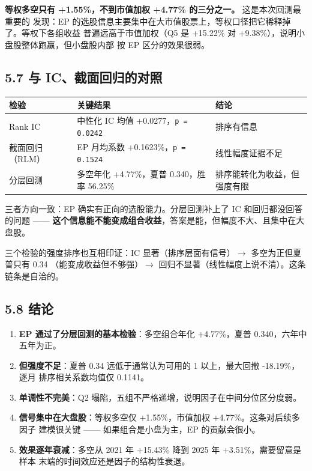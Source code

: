 \documentclass[UTF8,a4paper,11pt]{ctexart}
\begin{document}
\textbf{等权多空只有 +1.55\%，不到市值加权 +4.77\% 的三分之一。} 这是本次回测最重要的
发现：EP 的选股信息主要集中在大市值股票上，等权口径把它稀释掉了。等权下各组收益
普遍远高于市值加权（Q5 是 +15.22\% 对 +9.38\%），说明小盘股整体跑赢，但小盘股内部
按 EP 区分的效果很弱。

{}
\subsection*{5.7 与 IC、截面回归的对照}

\begin{table}[htbp]
\centering
\begin{tabularx}{\textwidth}{@{}YYY@{}}
\toprule
检验 & 关键结果 & 结论 \\
\midrule
Rank IC & 中性化 IC 均值 +0.0277，\texttt{p = 0.0242} & 排序有信息 \\
截面回归（RLM） & EP 月均系数 +0.1623\%，\texttt{p = 0.1524} & 线性幅度证据不足 \\
分层回测 & 多空年化 +4.77\%，夏普 0.340，胜率 56.25\% & 排序能转化为收益，但强度有限 \\
\bottomrule
\end{tabularx}
\end{table}

三者方向一致：EP 确实有正向的选股能力。分层回测补上了 IC 和回归都没回答的问题 ——
\textbf{这个信息能不能变成组合收益}，答案是能，但幅度不大、且集中在大盘股。

三个检验的强度排序也互相印证：IC 显著（排序层面有信号）$\rightarrow$ 多空为正但夏普只有 0.34
（能变成收益但不够强）$\rightarrow$ 回归不显著（线性幅度上说不清）。这条链条是自洽的。

{}
\subsection*{5.8 结论}

\begin{enumerate}[leftmargin=2.2em,itemsep=2pt,topsep=3pt]
\item 
\textbf{EP 通过了分层回测的基本检验}：多空组合年化 +4.77\%，夏普 0.340，六年中五年为正。

\item 
\textbf{但强度不足}：夏普 0.34 远低于通常认为可用的 1 以上，最大回撤 -18.19\%，逐月
排序相关系数均值仅 0.1141。

\item 
\textbf{单调性不完美}：Q2 塌陷，五组不严格递增，说明因子在中间分位区分度弱。

\item 
\textbf{信号集中在大盘股}：等权多空仅 +1.55\%，市值加权 +4.77\%。这条对后续多因子
建模很关键 —— 如果组合是小盘为主，EP 的贡献会很小。

\item 
\textbf{效果逐年衰减}：多空从 2021 年 +15.43\% 降到 2025 年 +3.51\%，需要留意是样本
末端的时间效应还是因子的结构性衰退。

\end{enumerate}
\end{document}
